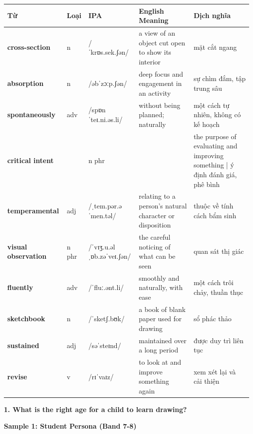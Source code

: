 \vspace{0.8em}
\begin{center}
\renewcommand{\arraystretch}{1.65}
\begin{tabularx}{\textwidth}{|V{0.22\textwidth}|C{0.07\textwidth}|I{0.20\textwidth}|Y|V{0.18\textwidth}|}
\hline
{}
\textbf{Từ} & \textbf{Loại} & \textbf{IPA} & \textbf{English Meaning} & \textbf{Dịch nghĩa} \\
\hline
\textbf{cross-section} & n & /ˈkrɒs.sek.ʃən/ & a view of an object cut open to show its interior & mặt cắt ngang \\ \hline
\textbf{absorption} & n & /əbˈzɔːp.ʃən/ & deep focus and engagement in an activity & sự chìm đắm, tập trung sâu \\ \hline
\textbf{spontaneously} & adv & /spɒnˈteɪ.ni.əs.li/ & without being planned; naturally & một cách tự nhiên, không có kế hoạch \\ \hline
\textbf{critical intent} & & n phr & & the purpose of evaluating and improving something | ý định đánh giá, phê bình \\ \hline
\textbf{temperamental} & adj & /ˌtem.pər.əˈmen.təl/ & relating to a person's natural character or disposition & thuộc về tính cách bẩm sinh \\ \hline
\textbf{visual observation} & n phr & /ˈvɪʒ.u.əl ˌɒb.zəˈveɪ.ʃən/ & the careful noticing of what can be seen & quan sát thị giác \\ \hline
\textbf{fluently} & adv & /ˈfluː.ənt.li/ & smoothly and naturally, with ease & một cách trôi chảy, thuần thục \\ \hline
\textbf{sketchbook} & n & /ˈsketʃ.bʊk/ & a book of blank paper used for drawing & sổ phác thảo \\ \hline
\textbf{sustained} & adj & /səˈsteɪnd/ & maintained over a long period & được duy trì liên tục \\ \hline
\textbf{revise} & v & /rɪˈvaɪz/ & to look at and improve something again & xem xét lại và cải thiện \\ \hline
\end{tabularx}
\end{center}

\partthreeheader

\begin{ieltsquestion}
\textbf{1. What is the right age for a child to learn drawing?}
\end{ieltsquestion}
\textbf{Sample 1: Student Persona (Band 7-8)}

